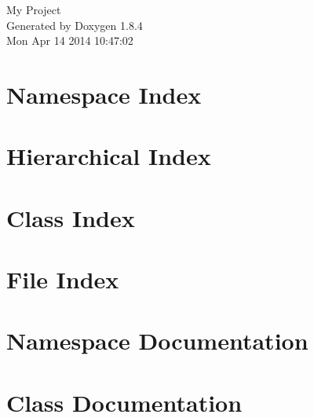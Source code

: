 \documentclass[twoside]{book}
\newcommand{\clearemptydoublepage}{%
  \newpage{\pagestyle{empty}\cleardoublepage}%
}
\begin{document}
\hypersetup{pageanchor=false}
\begin{titlepage}
\vspace*{7cm}
\begin{center}%
{\Large My Project }\\
\vspace*{1cm}
{\large Generated by Doxygen 1.8.4}\\
\vspace*{0.5cm}
{\small Mon Apr 14 2014 10:47:02}\\
\end{center}
\end{titlepage}
\clearemptydoublepage
\tableofcontents
\clearemptydoublepage
{}
\hypersetup{pageanchor=true}

\chapter{Namespace Index}

\chapter{Hierarchical Index}

\chapter{Class Index}

\chapter{File Index}

\chapter{Namespace Documentation}

\chapter{Class Documentation}


















\end{document}

